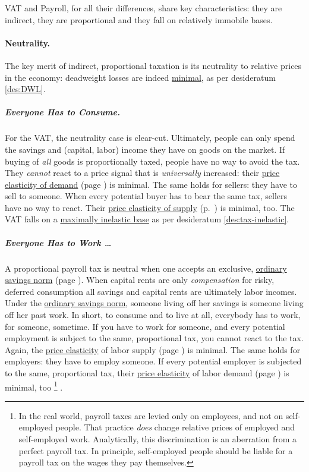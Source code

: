 VAT and Payroll, for all their differences, share key characteristics:
they are indirect, they are proportional and they fall on relatively immobile bases.

\paragraph{Neutrality.} The key merit of indirect, proportional taxation is its neutrality to relative prices in the economy:
deadweight losses are indeed \hyperref[des:DWL]{minimal}, as per desideratum \ref{des:DWL}.

\subparagraph{Everyone Has to Consume.} For the VAT, the neutrality case is clear-cut.
Ultimately, people can only spend the savings and (capital, labor) income they have on goods on the market.
If buying of \emph{all} goods is proportionally taxed, people have no way to avoid the tax.
They \emph{cannot} react to a price signal that is \emph{universally} increased:
their \hyperref[eq:PED]{price elasticity of demand} (page \pageref{eq:PED}) is minimal.
The same holds for sellers:
they have to sell to someone.
When every potential buyer has to bear the same tax, sellers have no way to react.
Their \hyperref[eq:PES]{price elasticity of supply} (p.~\pageref{eq:PES}) is minimal, too.
The VAT falls on a \hyperref[des:tax-inelastic]{maximally inelastic base} as per desideratum \ref{des:tax-inelastic}.

\subparagraph{Everyone Has to Work \ldots} A proportional payroll tax is neutral when one accepts an exclusive, \hyperref[sec:OSN]{ordinary savings norm} (page \pageref{sec:OSN}).
When capital rents are only \emph{compensation} for risky, deferred consumption all savings and capital rents are ultimately labor incomes.
Under the \hyperref[sec:OSN]{ordinary savings norm}, someone living off her savings is someone living off her past work.
In short, to consume and to live at all, everybody has to work, for someone, sometime.
If you have to work for someone, and every potential employment is subject to the same, proportional tax, you cannot react to the tax.
Again, the \hyperref[eq:PES]{price elasticity} of labor supply (page \pageref{eq:PES}) is minimal.
The same holds for employers:
they have to employ someone.
If every potential employer is subjected to the same, proportional tax, their \hyperref[eq:PES]{price elasticity} of labor demand (page \pageref{eq:PES}) is minimal, too
\footnote{
	In the real world, payroll taxes are levied only on employees, and not on self-employed people.
	That practice \emph{does} change relative prices of employed and self-employed work.
	Analytically, this discrimination is an aberration from a perfect payroll tax.
	In principle, self-employed people should be liable for a payroll tax on the wages they pay themselves.
}
.

